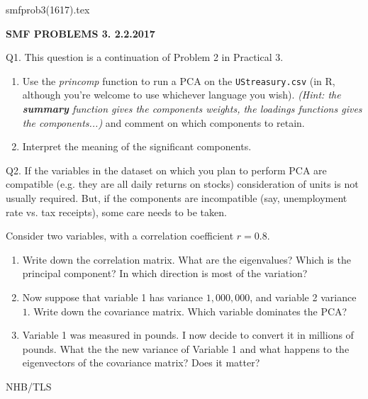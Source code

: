 \documentclass{article}
\begin{document}
\def\ni{\noindent}
\def\i{\indent}
\def\G{\Gamma}
\def\s{\sigma}
\def\t{\theta}
\def\z{\zeta}
\def\p{\partial}
\ni smfprob3(1617).tex
\begin{center}
{\bf SMF PROBLEMS 3.  2.2.2017}
\end{center}

\ni Q1.  This question is a continuation of Problem 2 in Practical 3.

\begin{enumerate}
 \item Use the \textit{princomp} function to run a PCA on the \texttt{UStreasury.csv} (in R, although you're welcome to use whichever language you wish). \textit{(Hint: the \textbf{summary} function gives the components weights, the loadings functions gives the components...)} and comment on which components to retain.
\item Interpret the meaning of the significant components.
\end{enumerate}

\ni Q2.  If the variables in the dataset on which you plan to perform PCA are compatible (e.g. they are all daily returns on stocks) consideration of units is not usually required. But, if the components are incompatible (say, unemployment rate vs. tax receipts), some care needs to be taken.

Consider two variables, with a correlation coefficient $r = 0.8$. 
\begin{enumerate}
\item Write down the correlation matrix. What are the eigenvalues? Which is the principal component? In which direction is most of the variation?
\item Now suppose that variable 1 has variance $1,000,000$, and variable 2 variance $1$. Write down the covariance matrix. Which variable dominates the PCA?
\item Variable 1 was measured in pounds. I now decide to convert it in millions of pounds. What the the new variance of Variable 1 and what happens to the eigenvectors of the covariance matrix? Does it matter?
\end{enumerate}


\hfil NHB/TLS \break
\end{document}
